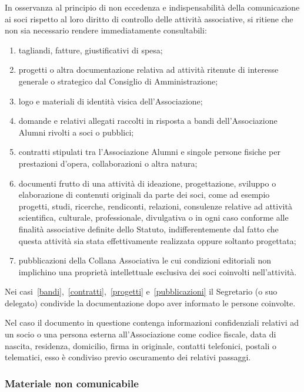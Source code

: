 In osservanza al principio di non eccedenza e indispensabilità della comunicazione ai soci rispetto al loro diritto di controllo delle attività associative, si ritiene che non sia necessario rendere immediatamente consultabili:
\begin{enumerate}
    \item tagliandi, fatture, giustificativi di spesa;
    \item progetti o altra documentazione relativa ad attività ritenute di interesse generale o strategico dal Consiglio di Amministrazione; 
    \item logo e materiali di identità visica dell’Associazione; 
    \item\label{bandi} domande e relativi allegati raccolti in risposta a bandi dell’Associazione Alumni rivolti a soci o pubblici;
    \item\label{contratti} contratti stipulati tra l’Associazione Alumni e singole persone fisiche per prestazioni d’opera, collaborazioni o altra natura; 
    \item\label{progetti} documenti frutto di una attività di ideazione, progettazione, sviluppo o elaborazione di contenuti originali da parte dei soci, come ad esempio progetti, studi, ricerche, rendiconti, relazioni, consulenze relative ad attività scientifica, culturale, professionale, divulgativa o in ogni caso conforme alle finalità associative definite dello Statuto, indifferentemente dal fatto che questa attività sia stata effettivamente realizzata oppure soltanto progettata; 
    \item\label{pubblicazioni} pubblicazioni della Collana Associativa le cui condizioni editoriali non implichino una proprietà intellettuale esclusiva dei soci coinvolti nell’attività.
\end{enumerate}
Nei casi~\ref{bandi},~\ref{contratti},~\ref{progetti} e~\ref{pubblicazioni} il
Segretario (o suo delegato) condivide la documentazione dopo aver informato
le persone coinvolte. 

Nel caso il documento in questione contenga informazioni confidenziali
relativi ad un socio o una persona esterna all’Associazione come codice
fiscale, data di nascita, residenza, domicilio, firma in originale, contatti
telefonici, postali o telematici, esso è condiviso previo oscuramento dei
relativi passaggi.

\subsubsection{Materiale non comunicabile}\label{materiale-non-comunicabile}

